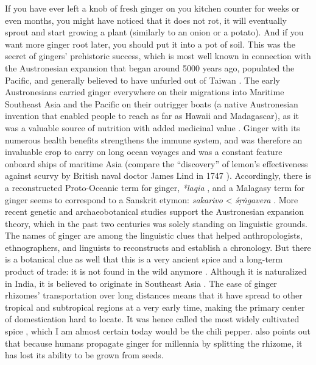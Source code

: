 If you have ever left a knob of fresh ginger on you kitchen counter for weeks or even months, you might have noticed that it does not rot, it will eventually sprout and start growing a plant (similarly to an onion or a potato). And if you want more ginger root later, you should put it into a pot of soil. This was the secret of gingers' prehistoric success, which is most well known in connection with the Austronesian expansion that began around 5000 years ago, populated the Pacific, and generally believed to have unfurled out of Taiwan \autocite{mirabal_ascertaining_2013}. The early Austronesians carried ginger everywhere on their migrations into Maritime Southeast Asia and the Pacific on their outrigger boats (a native Austronesian invention that enabled people to reach as far as Hawaii and Madagascar), as it was a valuable source of nutrition with added medicinal value \autocite[see][21-25]{dalby_dangerous_2000}. Ginger with its numerous health benefits strengthens the immune system, and was therefore an invaluable crop to carry on long ocean voyages and was a constant feature onboard ships of maritime Asia (compare the ``discovery'' of lemon's effectiveness against scurvy by British naval doctor James Lind in 1747 \autocite{allan_finding_2021}). Accordingly, there is a reconstructed Proto-Oceanic term for ginger, \textit{*laqia} \autocite[52]{bellwood_austronesians_2006}, and a Malagasy term for ginger seems to correspond to a Sanskrit etymon: \textit{sakarivo} < \textit{śṛṅgavera} \autocite[41]{adelaar_malay_1994}. More recent genetic and archaeobotanical studies support the Austronesian expansion theory, which in the past two centuries was solely standing on linguistic grounds. The names of ginger are among the linguistic clues that helped anthropologists, ethnographers, and linguists to reconstructs and establish a chronology. But there is a botanical clue as well that this is a very ancient spice and a long-term product of trade: it is not found in the wild anymore \autocite{ravindran_ginger_2005}. Although it is naturalized in India, it is believed to originate in Southeast Asia \autocite{ravindran_ginger_2005}. The ease of ginger rhizomes' transportation over long distances means that it have spread to other tropical and subtropical regions at a very early time, making the primary center of domestication hard to locate. It was hence called the most widely cultivated spice \autocite{lawrence_major_1984}, which I am almost certain today would be the chili pepper. \textcite{dalby_dangerous_2000} also points out that because humans propagate ginger for millennia by splitting the rhizome, it has lost its ability to be grown from seeds.

